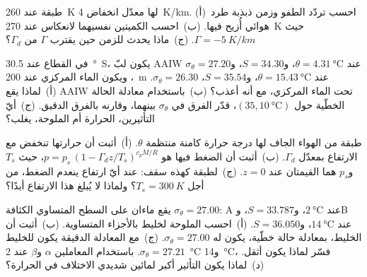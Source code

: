 \begin{exercise}[$\star\star$]\label{exo:b1:fluid-envelopes-structure:8}
طبقة عند \qty{260}{K} لها معدّل انخفاض \qty{4}{K/km}. (أ)~احسب تردّد الطفو وزمن ذبذبة طرد هوائي أُزيح فيها. (ب)~احسب الكميتين نفسيهما لانعكاس عند \qty{270}{K} حيث $\Gamma = \qty{-5}{K/km}$. (ج)~ماذا يحدث للزمن حين يقترب $\Gamma$ من $\Gamma_d$؟
\end{exercise}

\begin{exercise}[$\star\star$]\label{exo:b1:fluid-envelopes-structure:9}
في القطاع عند \qty{30.5}{\degree S}، يكون لبّ AAIW عند $\theta =
\qty{4.31}{\celsius}$، و$S = 34.30$، و$\sigma_\theta = 27.20$، ويكون الماء المركزي عند \qty{200}{m} عند $\theta = \qty{15.43}{\celsius}$، و$S = 35.54$،
$\sigma_\theta = 26.30$. (أ)~لماذا يقع AAIW تحت الماء المركزي، مع أنه أعذب؟ (ب)~باستخدام معادلة الحالة الخطّية حول $(35, \qty{10}{\celsius})$، قدّر الفرق في $\sigma_\theta$ بينهما، وقارنه بالفرق الدقيق. (ج)~أيّ التأثيرين، الحرارة أم الملوحة، يغلب؟
\end{exercise}

\begin{exercise}[$\star\star\star$]\label{exo:b1:fluid-envelopes-structure:10}
طبقة من الهواء الجاف لها درجة حرارة كامنة منتظمة $\theta$. (أ)~أثبت أن حرارتها تنخفض مع الارتفاع بمعدّل $\Gamma_d$. (ب)~أثبت أن الضغط فيها هو $p = p_s\,(1 - \Gamma_d z/T_s)^{c_pM/R}$، حيث $T_s$ و$p_s$ هما القيمتان عند $z = 0$. (ج)~لطبقة كهذه سقف: عند أيّ ارتفاع ينعدم الضغط، من أجل $T_s = \qty{300}{K}$؟ ولماذا لا يُبلغ هذا الارتفاع أبدًا؟
\end{exercise}

\begin{exercise}[$\star\star\star$]\label{exo:b1:fluid-envelopes-structure:11}
يقع ماءان على السطح المتساوي الكثافة $\sigma_\theta = 27.00$: A عند $\qty{2}{\celsius}$، و$S = 33.787$، وB عند $\qty{14}{\celsius}$، و$S = 36.050$. (أ)~احسب الملوحة  لخليط بالأجزاء المتساوية. (ب)~أثبت أن الخليط، بمعادلة حالة خطّية، يكون له $\sigma_\theta = 27.00$. (ج)~مع المعادلة الدقيقة يكون للخليط $\sigma_\theta = 27.21$. باستخدام المعاملين $\alpha$ و$\beta$ عند \qty{2}{\celsius} و\qty{14}{\celsius}، فسّر لماذا يكون أثقل. (د)~لماذا يكون التأثير أكبر لمائين شديدي الاختلاف في الحرارة؟
\end{exercise}

